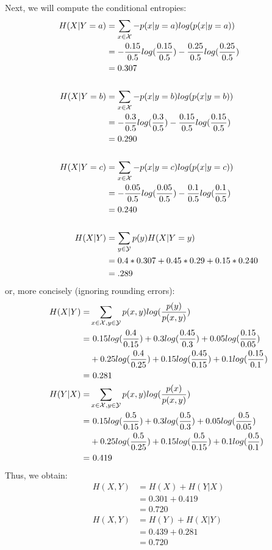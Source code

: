 \documentclass{article}
\begin{document}
Next, we will compute the conditional entropies:
\begin{align*}
H(X | Y = a) &= \sum_{x \in  \mathcal{X}} -p(x|y=a)log(p( x | y=a))\\
&= -\frac{0.15}{0.5}log(\frac{0.15}{0.5}) - \frac{0.25}{0.5} log(\frac{0.25}{0.5})\\
&= 0.307\\
\\
H(X | Y = b) &= \sum_{x \in  \mathcal{X}} -p(x|y=b)log(p( x | y=b))\\
&= -\frac{0.3}{0.5}log(\frac{0.3}{0.5}) - \frac{0.15}{0.5} log(\frac{0.15}{0.5})\\
&= 0.290\\
\\
H(X | Y = c) &= \sum_{x \in  \mathcal{X}} -p(x|y=c)log(p( x | y=c))\\
&= -\frac{0.05}{0.5}log(\frac{0.05}{0.5}) - \frac{0.1}{0.5} log(\frac{0.1}{0.5})\\
&= 0.240\\
\\
H(X|Y) &= \sum_{y \in  \mathcal{Y}} p(y) H(X|Y=y)\\
&= 0.4*0.307 + 0.45*0.29 + 0.15*0.240\\
&= .289
\\
\end{align*}
or, more concisely (ignoring rounding errors):
\begin{align*}
H(X | Y) =& \sum_{x \in  \mathcal{X} ,y \in  \mathcal{Y}} p(x,y)log(\frac{p(y)}{p( x, y)})\\
=&~0.15log(\frac{0.4}{0.15}) + 0.3 log(\frac{0.45}{0.3}) + 0.05 log(\frac{0.15}{0.05})\\
&+ 0.25log(\frac{0.4}{0.25}) + 0.15 log(\frac{0.45}{0.15}) + 0.1 log(\frac{0.15}{0.1})\\
=&~0.281
\\
H(Y | X) =& \sum_{x \in  \mathcal{X} ,y \in  \mathcal{Y}} p(x,y)log(\frac{p(x)}{p( x, y)})\\
=&~0.15 log(\frac{0.5}{0.15}) + 0.3 log(\frac{0.5}{0.3}) + 0.05 log(\frac{0.5}{0.05})\\
&+ 0.25 log(\frac{0.5}{0.25}) + 0.15 log(\frac{0.5}{0.15}) + 0.1 log(\frac{0.5}{0.1})\\
=&~0.419
\end{align*}
Thus, we obtain:
\begin{align*}
H(X,Y) &= H(X) + H(Y|X)\\
&= 0.301+0.419\\
& = 0.720\\
H(X,Y) &= H(Y) + H(X|Y)\\
&= 0.439+0.281\\
&= 0.720\\
\end{align*}
\end{document}
